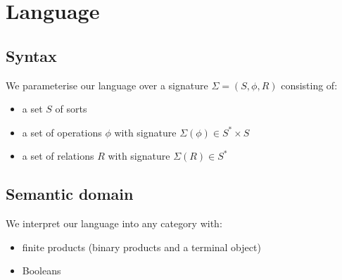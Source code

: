 \section{Language}

\subsection{Syntax}

We parameterise our language over a signature $\Sigma = (S, \phi, R)$ consisting of:
\begin{itemize}
\item a set $S$ of sorts
\item a set of operations $\phi$ with signature $\Sigma(\phi) \in S^* \times S$
\item a set of relations $R$ with signature $\Sigma(R) \in S^*$
\end{itemize}



\subsection{Semantic domain}

We interpret our language into any category with:
\begin{itemize}
\item finite products (binary products and a terminal object)
\item Booleans
\end{itemize}
